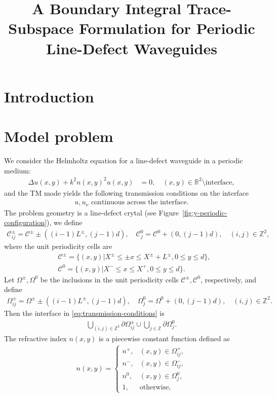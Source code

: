 \documentclass[11pt,fleqn]{article}
\title{A Boundary Integral Trace-Subspace Formulation for Periodic Line-Defect Waveguides}
\author{}
\date{}
\theoremstyle{definition}
\theoremstyle{remark}
\begin{document}
\maketitle

\section{Introduction}

\section{Model problem}
We consider the Helmholtz equation for a line-defect waveguide in a periodic medium: 
\begin{align}
 \Delta u(x, y) + k^2 n(x, y)^2 u(x, y) &= 0, \quad (x, y) \in \mathbb{R}^2 \setminus \text{interface}, \label{eq:helmholtz-equation}
\end{align}
and the TM mode yields the following transmission conditions on the interface \begin{align}
  u, u_\nu \text{ continuous across the interface.} \label{eq:transmission-conditions}
\end{align}
The problem geometry is a line-defect crytal (see Figure~\ref{fig:y-periodic-configuration}), we
define \begin{align*}
  \mathcal{C}^\pm_{ij} = \mathcal{C}^\pm \pm ((i-1)L^\pm, (j-1)d), \quad
  \mathcal{C}^0_j = \mathcal{C}^0 + (0, (j-1)d),\quad (i,j) \in \mathbb{Z}^2,
\end{align*}
where the unit periodicity cells are \begin{align*}
  &\mathcal{C}^\pm = \{ (x, y) | X^\pm \leq \pm x \leq X^\pm + L^\pm, 0 \leq y \leq d \},\\
  &\mathcal{C}^0 = \{ (x, y) | X^- \leq x \leq X^+, 0 \leq y \leq d \}.
\end{align*}
Let $\Omega^\pm, \Omega^0$ be the inclusions in the unit periodicity cells $\mathcal{C}^\pm, \mathcal{C}^0$, respectively, and define \begin{align*}
  \Omega^\pm_{ij} = \Omega^\pm \pm ((i-1)L^\pm, (j-1)d), \quad
  \Omega^0_j = \Omega^0 + (0, (j-1)d),\quad (i,j) \in \mathbb{Z}^2.
\end{align*}
Then the interface in \eqref{eq:transmission-conditions} is \begin{align*}
  \bigcup_{(i,j) \in \mathbb{Z}^2} \partial\Omega^\pm_{ij} \cup
  \bigcup_{j \in \mathbb{Z}} \partial\Omega^0_j.
\end{align*}
The refractive index $n(x, y)$ is a piecewise constant function defined as \begin{align}
  n(x,y) = \begin{cases}
    n^+, & (x,y) \in \Omega^+_{ij},\\
    n^-, & (x,y) \in \Omega^-_{ij},\\
    n^0, & (x,y) \in \Omega^0_j,\\
    1, & \text{otherwise},
  \end{cases}
\end{align}
\end{document}
